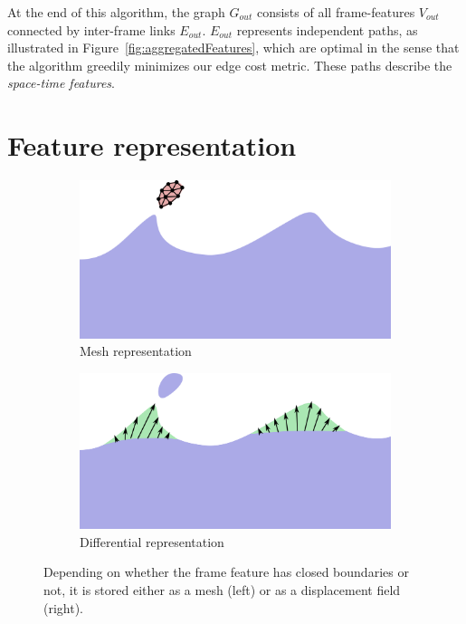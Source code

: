At the end of this algorithm, the graph $G_{out}$ consists of all frame-features $V_{out}$ connected by inter-frame links $E_{out}$.
$E_{out}$ represents independent paths, as illustrated in Figure~\ref{fig:aggregatedFeatures}, which are optimal in the sense that the algorithm greedily minimizes our edge cost metric. 
These paths describe the \emph{space-time features}. 

\section{Feature representation}
\label{sec:representation}

\begin{figure}[ht!]
\centering
\label{fig:featureRepresentation}
    \begin{subfigure}[b]{0.46\linewidth}
    \centering
    \includegraphics[width=\textwidth]{images/fluidsculpting-mig2016/isolatedFeature.png}
    \caption{\label{fig:feature_representation:mesh}Mesh representation}
    \end{subfigure}
    \hspace{0.1cm}
    \begin{subfigure}[b]{0.46\linewidth}
    \centering
    \includegraphics[width=\textwidth]{images/fluidsculpting-mig2016/detailFeature.png}
    \caption{\label{fig:feature_representation:displacement}Differential representation}
    \end{subfigure}
    \caption[Fluid sculpting: Feature representation]{
Depending on whether the frame feature has closed boundaries or not, it is stored either as a mesh (left) or as a displacement field (right).}
\label{fig:feature_representation}
\end{figure}


